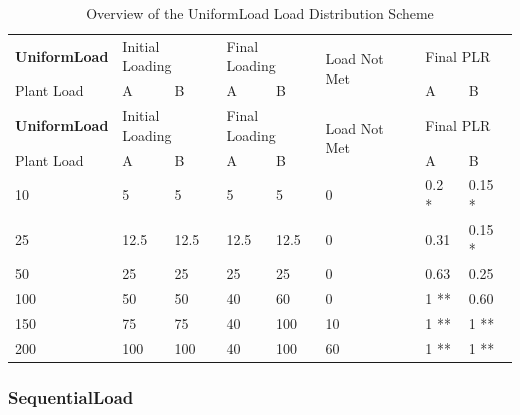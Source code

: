\begin{longtable}[c]{|l|p{0.5in}|p{0.5in}|p{0.5in}|p{0.5in}|l|p{0.5in}|p{0.5in}|}
    \caption{Overview of the UniformLoad Load Distribution Scheme}
    \label{tab:uniform-load-overview}\\
\hline
\textbf{UniformLoad} & \multicolumn{2}{l|}{Initial Loading} & \multicolumn{2}{l|}{Final Loading} & \multirow{2}{*}{Load Not Met} & \multicolumn{2}{l|}{Final PLR} \\ \cline{1-5} \cline{7-8}
Plant Load           & A                 & B                & A                & B               &                               & A              & B             \\ \hline
\endfirsthead
\hline
\textbf{UniformLoad} & \multicolumn{2}{l|}{Initial Loading} & \multicolumn{2}{l|}{Final Loading} & \multirow{2}{*}{Load Not Met} & \multicolumn{2}{l|}{Final PLR} \\ \cline{1-5} \cline{7-8}
Plant Load           & A                 & B                & A                & B               &                               & A              & B             \\ \hline
\endhead

10          & 5                 & 5                & 5            & 5           & 0                      & 0.2 *      & 0.15 *      \\ \hline
25          & 12.5              & 12.5             & 12.5         & 12.5        & 0                      & 0.31       & 0.15 *      \\ \hline
50          & 25                & 25               & 25           & 25          & 0                      & 0.63       & 0.25        \\ \hline
100         & 50                & 50               & 40           & 60          & 0                      & 1 **       & 0.60        \\ \hline
150         & 75                & 75               & 40           & 100         & 10                     & 1 **       & 1 **        \\ \hline
200         & 100               & 100              & 40           & 100         & 60                     & 1 **       & 1 **        \\ \hline

\end{longtable}



\subsubsection{SequentialLoad}%
\label{ssub:sequentialload}

